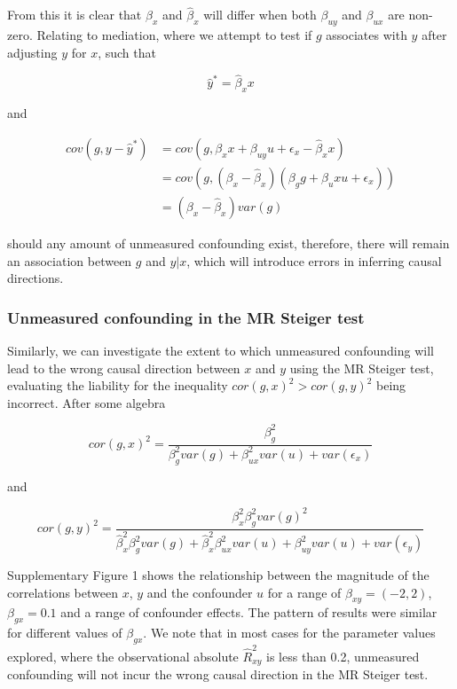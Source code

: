 \documentclass[]{article}
\begin{document}
From this it is clear that \(\beta_x\) and \(\hat{\beta}_x\) will differ
when both \(\beta_{uy}\) and \(\beta_{ux}\) are non-zero. Relating to
mediation, where we attempt to test if \(g\) associates with \(y\) after
adjusting \(y\) for \(x\), such that

\[
\hat{y}^* = \hat{\beta}_x x
\]

and

\[
\begin{aligned}
cov(g, y - \hat{y}^*) & = cov(g, \beta_x x + \beta_{uy} u + \epsilon_x - \hat{\beta}_x x) \\
& = cov(g, (\beta_x - \hat{\beta}_x)(\beta_g g + \beta_ux u + \epsilon_x)) \\
& = (\beta_x - \hat{\beta}_x) var(g)
\end{aligned}
\]

should any amount of unmeasured confounding exist, therefore, there will
remain an association between \(g\) and \(y|x\), which will introduce
errors in inferring causal directions.

\subsubsection{Unmeasured confounding in the MR Steiger
test}\label{unmeasured-confounding-in-the-mr-steiger-test}

Similarly, we can investigate the extent to which unmeasured confounding
will lead to the wrong causal direction between \(x\) and \(y\) using
the MR Steiger test, evaluating the liability for the inequality
\(cor(g,x)^2 > cor(g,y)^2\) being incorrect. After some algebra

\[
cor(g,x)^2 = \frac{\beta_g^2}{\beta_g^2var(g) + \beta_{ux}^2 var(u) + var(\epsilon_x)}
\]

and

\[
cor(g,y)^2 = \frac{\beta_x^2 \beta_g^2 var(g)^2} {\hat{\beta}_x^2 \beta_g^2 var(g) + \hat{\beta}_x^2 \beta_{ux}^2 var(u) + \beta_{uy}^2 var(u) + var(\epsilon_y)}
\]

Supplementary Figure 1 shows the relationship between the magnitude of
the correlations between \(x\), \(y\) and the confounder \(u\) for a
range of \(\beta_{xy} = (-2,2)\), \(\beta_{gx} = 0.1\) and a range of
confounder effects. The pattern of results were similar for different
values of \(\beta_{gx}\). We note that in most cases for the parameter
values explored, where the observational absolute \(\hat{R}^2_{xy}\) is
less than 0.2, unmeasured confounding will not incur the wrong causal
direction in the MR Steiger test.
\end{document}
